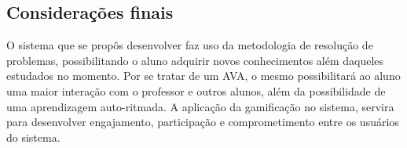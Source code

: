 

\subsection{Considerações finais}

O sistema que se propôs desenvolver faz uso da metodologia de resolução de problemas, possibilitando o aluno adquirir novos conhecimentos além daqueles estudados no momento. Por se tratar de um AVA, o mesmo possibilitará ao aluno uma maior interação com o professor e outros alunos, além da possibilidade de uma aprendizagem auto-ritmada. A aplicação da gamificação no sistema, servira para desenvolver  engajamento, participação e comprometimento entre os usuários do sistema. 